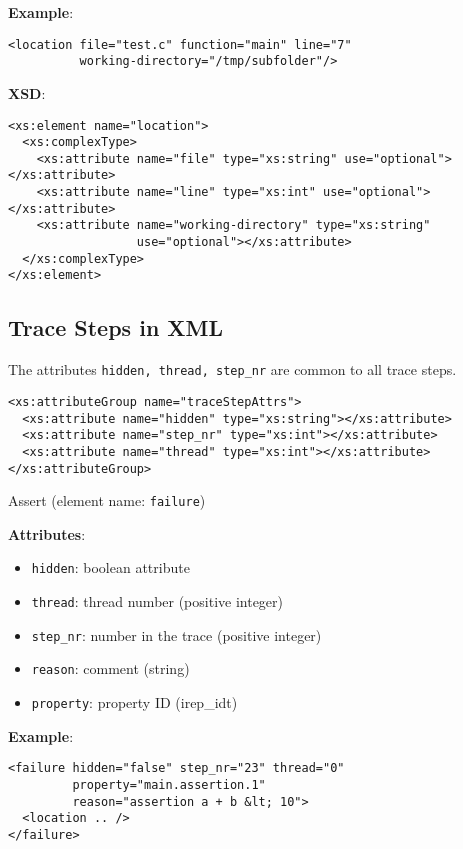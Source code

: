 \documentclass[12pt]{article}
\begin{document}
\noindent\textbf{Example}:
\begin{verbatim}
<location file="test.c" function="main" line="7"
          working-directory="/tmp/subfolder"/>
\end{verbatim}

\noindent\textbf{XSD}:
\begin{verbatim}
<xs:element name="location">
  <xs:complexType>
    <xs:attribute name="file" type="xs:string" use="optional"></xs:attribute>
    <xs:attribute name="line" type="xs:int" use="optional"></xs:attribute>
    <xs:attribute name="working-directory" type="xs:string"
                  use="optional"></xs:attribute>
  </xs:complexType>
</xs:element>
\end{verbatim}  
  
\subsection{Trace Steps in XML}
\vspace{1em}
\noindent The attributes \texttt{hidden, thread, step\_nr} are common to all trace steps.

\begin{verbatim}
<xs:attributeGroup name="traceStepAttrs">
  <xs:attribute name="hidden" type="xs:string"></xs:attribute>
  <xs:attribute name="step_nr" type="xs:int"></xs:attribute>
  <xs:attribute name="thread" type="xs:int"></xs:attribute>
</xs:attributeGroup>
\end{verbatim}

\begin{center}
{\Large Assert} (element name: \texttt{failure})
\end{center}

\noindent\textbf{Attributes}:
\begin{itemize}
\item \texttt{hidden}: boolean attribute
\item \texttt{thread}: thread number (positive integer)
\item \texttt{step\_nr}: number in the trace (positive integer)
\item \texttt{reason}: comment (string)
\item \texttt{property}: property ID (irep\_idt)
\end{itemize}

\noindent\textbf{Example}:
\begin{verbatim}
<failure hidden="false" step_nr="23" thread="0"
         property="main.assertion.1"
         reason="assertion a + b &lt; 10">
  <location .. />         
</failure>
\end{verbatim}
\end{document}
